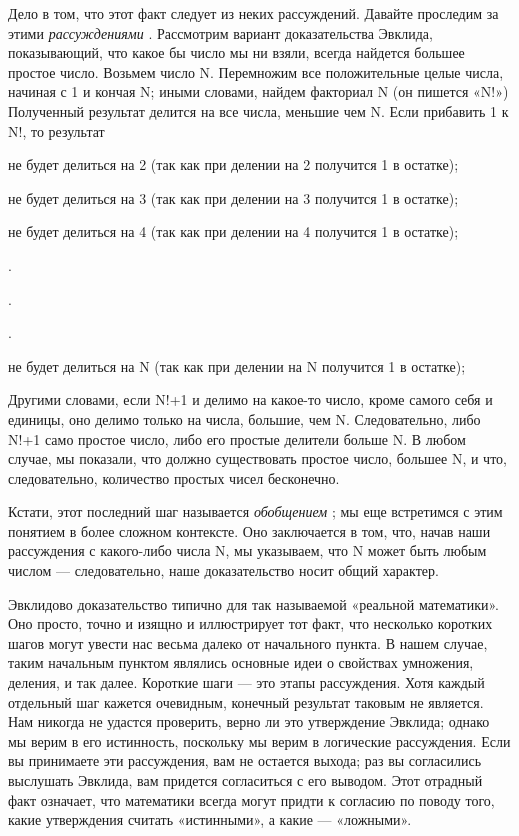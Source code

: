 Дело в том, что этот факт следует из неких рассуждений. Давайте проследим за этими \emph{рассуждениями} . Рассмотрим вариант доказательства Эвклида, показывающий, что какое бы число мы ни взяли, всегда найдется большее простое число. Возьмем число N. Перемножим все положительные целые числа, начиная с 1 и кончая N; иными словами, найдем факториал N (он пишется «N!») Полученный результат делится на все числа, меньшие чем N. Если прибавить 1 к N!, то результат

не будет делиться на 2 (так как при делении на 2 получится 1 в остатке);

не будет делиться на 3 (так как при делении на 3 получится 1 в остатке);

не будет делиться на 4 (так как при делении на 4 получится 1 в остатке);

.

.

.

не будет делиться на N (так как при делении на N получится 1 в остатке);

Другими словами, если N!+1 и делимо на какое-то число, кроме самого себя и единицы, оно делимо только на числа, большие, чем N. Следовательно, либо N!+1 само простое число, либо его простые делители больше N. В любом случае, мы показали, что должно существовать простое число, большее N, и что, следовательно, количество простых чисел бесконечно.

Кстати, этот последний шаг называется \emph{обобщением} ; мы еще встретимся с этим понятием в более сложном контексте. Оно заключается в том, что, начав наши рассуждения с какого-либо числа N, мы указываем, что N может быть любым числом --- следовательно, наше доказательство носит общий характер.

Эвклидово доказательство типично для так называемой «реальной математики». Оно просто, точно и изящно и иллюстрирует тот факт, что несколько коротких шагов могут увести нас весьма далеко от начального пункта. В нашем случае, таким начальным пунктом являлись основные идеи о свойствах умножения, деления, и так далее. Короткие шаги --- это этапы рассуждения. Хотя каждый отдельный шаг кажется очевидным, конечный результат таковым не является. Нам никогда не удастся проверить, верно ли это утверждение Эвклида; однако мы верим в его истинность, поскольку мы верим в логические рассуждения. Если вы принимаете эти рассуждения, вам не остается выхода; раз вы согласились выслушать Эвклида, вам придется согласиться с его выводом. Этот отрадный факт означает, что математики всегда могут придти к согласию по поводу того, какие утверждения считать «истинными», а какие --- «ложными».

